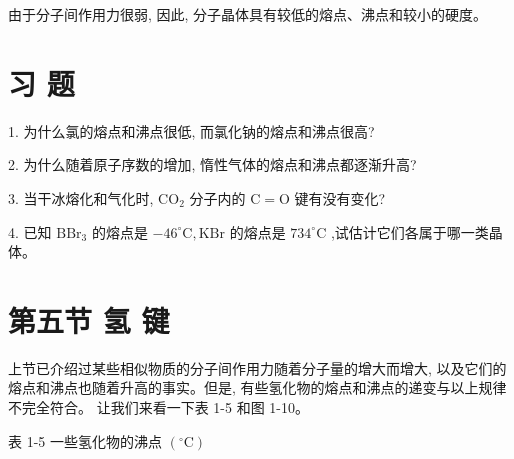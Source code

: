 \documentclass[10pt]{article}
\begin{document}
由于分子间作用力很弱, 因此, 分子晶体具有较低的熔点、沸点和较小的硬度。

\section*{习 题}

1. 为什么氯的熔点和沸点很低, 而氯化钠的熔点和沸点很高?

2. 为什么随着原子序数的增加, 惰性气体的熔点和沸点都逐渐升高?

3. 当干冰熔化和气化时, \({\mathrm{{CO}}}_{2}\) 分子内的 \(\mathrm{C} = \mathrm{O}\) 键有没有变化?

4. 已知 \({\mathrm{{BBr}}}_{3}\) 的熔点是 \(- {46}^{ \circ }\mathrm{C},\mathrm{{KBr}}\) 的熔点是 \({734}^{ \circ }\mathrm{C}\) ,试估计它们各属于哪一类晶体。

\section*{第五节 氢 键}

上节已介绍过某些相似物质的分子间作用力随着分子量的增大而增大, 以及它们的熔点和沸点也随着升高的事实。但是, 有些氢化物的熔点和沸点的递变与以上规律不完全符合。 让我们来看一下表 1-5 和图 1-10。

表 1-5 一些氢化物的沸点 \(\left( {{}^{ \circ }\mathrm{C}}\right)\)

\begin{center}
\end{center}
\end{document}

